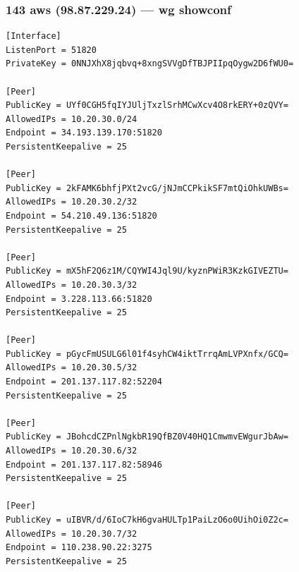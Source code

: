 \documentclass[11pt,a4paper]{article}
\begin{document}
\subsubsection*{143 aws (98.87.229.24) — wg showconf}
\begin{lstlisting}
[Interface]
ListenPort = 51820
PrivateKey = 0NNJXhX8jqbvq+8xngSVVgDfTBJPIIpqOygw2D6fWU0=

[Peer]
PublicKey = UYf0CGH5fqIYJUljTxzlSrhMCwXcv4O8rkERY+0zQVY=
AllowedIPs = 10.20.30.0/24
Endpoint = 34.193.139.170:51820
PersistentKeepalive = 25

[Peer]
PublicKey = 2kFAMK6bhfjPXt2vcG/jNJmCCPkikSF7mtQiOhkUWBs=
AllowedIPs = 10.20.30.2/32
Endpoint = 54.210.49.136:51820
PersistentKeepalive = 25

[Peer]
PublicKey = mX5hF2Q6z1M/CQYWI4Jql9U/kyznPWiR3KzkGIVEZTU=
AllowedIPs = 10.20.30.3/32
Endpoint = 3.228.113.66:51820
PersistentKeepalive = 25

[Peer]
PublicKey = pGycFmUSULG6l01f4syhCW4iktTrrqAmLVPXnfx/GCQ=
AllowedIPs = 10.20.30.5/32
Endpoint = 201.137.117.82:52204
PersistentKeepalive = 25

[Peer]
PublicKey = JBohcdCZPnlNgkbR19QfBZ0V40HQ1CmwmvEWgurJbAw=
AllowedIPs = 10.20.30.6/32
Endpoint = 201.137.117.82:58946
PersistentKeepalive = 25

[Peer]
PublicKey = uIBVR/d/6IoC7kH6gvaHULTp1PaiLzO6o0UihOi0Z2c=
AllowedIPs = 10.20.30.7/32
Endpoint = 110.238.90.22:3275
PersistentKeepalive = 25

\end{lstlisting}
\end{document}
